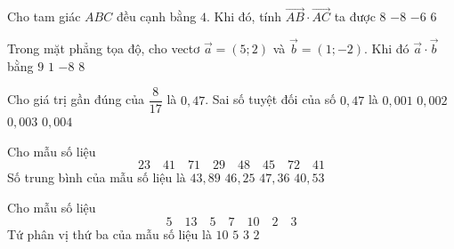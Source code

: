 \begin{ex}%
    Cho tam giác $ABC$ đều cạnh bằng $4$. Khi đó, tính $\overrightarrow{AB}\cdot\overrightarrow{AC}$ ta được
    \choice
    {\True $8$}
    {$-8$}
    {$-6$}
    {$6$}
\end{ex}
\begin{ex}%
    Trong mặt phẳng tọa độ, cho vectơ $\overrightarrow{a}=(5;2)$ và $\overrightarrow{b}=(1;-2)$. Khi đó $\overrightarrow{a}\cdot\overrightarrow{b}$ bằng
    \choice
    {$9$}
    {\True $1$}
    {$-8$}
    {$8$}
\end{ex}    
\begin{ex}%
    Cho giá trị gần đúng của $\dfrac{8}{17}$ là $0{,}47$. Sai số tuyệt đối của số $0{,}47$  là
    \choice
    {\True $0{,}001$}
    {$0{,}002$}
    {$0{,}003$}
    {$0{,}004$}
\end{ex}
\begin{ex}%
    Cho mẫu số liệu
    $$23 \quad 41 \quad 71 \quad 29 \quad 48 \quad 45 \quad 72 \quad 41$$
    Số trung bình của mẫu số liệu là
    \choice 
    {$43{,}89$} 
    {\True $46{,}25$} 
    {$47{,}36$} 
    {$40{,}53$}
\end{ex}
\begin{ex}%
    Cho mẫu số liệu
    $$5 \quad 13 \quad 5 \quad 7 \quad 10 \quad 2 \quad 3$$
    Tứ phân vị thứ ba của mẫu số liệu là
    \choice 
    {\True $10$} 
    {$5$} 
    {$3$} 
    {$2$}
\end{ex}
